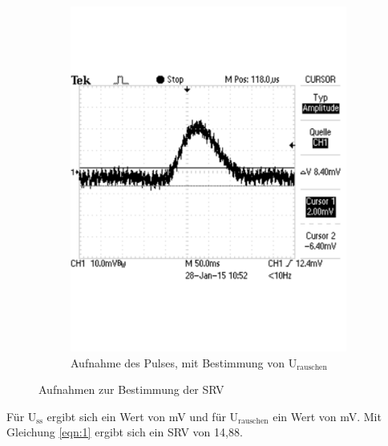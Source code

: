 \documentclass[12pt,a4paper]{article}
\begin{document}
\begin{figure}[H]
\begin{subfigure}[b]{0.45\textwidth}
   \includegraphics[trim = 0mm 50mm 0mm 50mm, clip, scale = 0.4]{a2_rauschen.pdf}
  \caption[Aufnahme des Pulses, mit Bestimmung von U$_\text{rauschen}$]{Aufnahme des Pulses, mit Bestimmung von U$_\text{rauschen}$} 
  \label{fig:u_rauschen}
\end{subfigure}
\caption{Aufnahmen zur Bestimmung der SRV}
\label{fig:srv}
\end{figure}

Für U$_\text{ss}$ ergibt sich ein Wert von \unit[32,4]{mV} und für U$_\text{rauschen}$ ein Wert von \unit[8,4]{mV}. Mit Gleichung \ref{eqn:1} ergibt sich ein SRV von 14,88.
\end{document}
